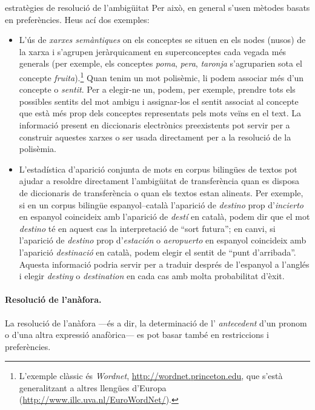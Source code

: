 \begin{persabermes}{estratègies de resolució de l'ambigüitat}
Per això, en general s'usen mètodes basats en preferències. Heus ací
dos exemples:
\begin{itemize}
\item L'ús de \emph{xarxes semàntiques} on els conceptes se situen en
  els nodes (nusos) de la xarxa i s'agrupen jeràrquicament en
  superconceptes cada vegada més generals (per exemple, els conceptes
  \emph{poma}, \emph{pera}, \emph{taronja} s'agruparien sota el
  concepte \emph{fruita}).\footnote{L'exemple clàssic és
    \emph{Wordnet}, \url{http://wordnet.princeton.edu}, que s'està
    generalitzant a altres llengües d'Europa
    (\url{http://www.illc.uva.nl/EuroWordNet/}).}  Quan tenim un mot
  polisèmic, li podem associar més d'un concepte o \emph{sentit}. Per
  a elegir-ne un, podem, per exemple, prendre tots els possibles
  sentits del mot ambigu i assignar-los el sentit associat al concepte
  que està més prop dels conceptes representats pels mots veïns en el
  text.  La informació present en diccionaris electrònics preexistents
  pot servir per a construir aquestes xarxes o ser usada directament
  per a la resolució de la polisèmia.
\item L'estadística d'aparició conjunta de mots en corpus bilingües de
  textos pot ajudar a resoldre directament l'ambigüitat de
  transferència quan es disposa de diccionaris de transferència o quan
  els textos estan alineats. Per exemple, si en un corpus bilingüe
  espanyol--català l'aparició de \emph{destino} prop d'\emph{incierto}
  en espanyol coincideix amb l'aparició de \emph{destí} en català,
  podem dir que el mot \emph{destino} té en aquest cas la
  interpretació de ``sort futura''; en canvi, si l'aparició de {\em
    destino} prop d'\emph{estación} o \emph{aeropuerto} en espanyol
  coincideix amb l'aparició \emph{destinació} en català, podem elegir
  el sentit de ``punt d'arribada''. Aquesta informació podria servir
  per a traduir després de l'espanyol a l'anglés i elegir {\em
    destiny} o \emph{destination} en cada cas amb molta probabilitat
  d'èxit. %
  \end{itemize}

  \paragraph{Resolució de l'anàfora.}
  La resolució de l'anàfora ---és a dir, la determinació de l'{\em
    antecedent} d'un pronom o d'una altra expressió anafòrica--- es
  pot basar també en restriccions i preferències.


\end{persabermes}
